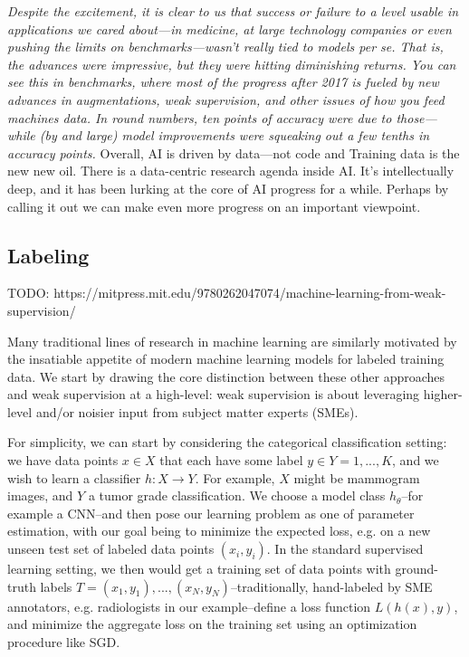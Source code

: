 \documentclass[openany]{book}
\begin{document}
\textit{Despite the excitement, it is clear to us that success or failure to a level usable in applications we cared about—in medicine, at large technology companies or even pushing the limits on benchmarks—wasn’t really tied to models per se. That is, the advances were impressive, but they were hitting diminishing returns. You can see this in benchmarks, where most of the progress after 2017 is fueled by new advances in augmentations, weak supervision, and other issues of how you feed machines data. In round numbers, ten points of accuracy were due to those—while (by and large) model improvements were squeaking out a few tenths in accuracy points.
}
Overall, AI is driven by data—not code and Training data is the new new oil. There is a data-centric research agenda inside AI. It’s intellectually deep, and it has been lurking at the core of AI progress for a while. Perhaps by calling it out we can make even more progress on an important viewpoint.


\subsection{Labeling}


TODO: https://mitpress.mit.edu/9780262047074/machine-learning-from-weak-supervision/

Many traditional lines of research in machine learning are similarly motivated by the insatiable appetite of modern machine learning models for labeled training data. We start by drawing the core distinction between these other approaches and weak supervision at a high-level: weak supervision is about leveraging higher-level and/or noisier input from subject matter experts (SMEs).

For simplicity, we can start by considering the categorical classification setting: we have data points \(x \in X\) that each have some label \(y \in Y = {1,...,K}\), and we wish to learn a classifier \(h : X \rightarrow Y\). For example, \(X\) might be mammogram images, and \(Y\) a tumor grade classification. We choose a model class \(h_\theta\)–for example a CNN–and then pose our learning problem as one of parameter estimation, with our goal being to minimize the expected loss, e.g. on a new unseen test set of labeled data points \((x_i, y_i)\). In the standard supervised learning setting, we then would get a training set of data points with ground-truth labels \(T = {(x_1, y_1), ..., (x_N, y_N)}\)–traditionally, hand-labeled by SME annotators, e.g. radiologists in our example–define a loss function \(L(h(x), y)\), and minimize the aggregate loss on the training set using an optimization procedure like SGD.
\end{document}
